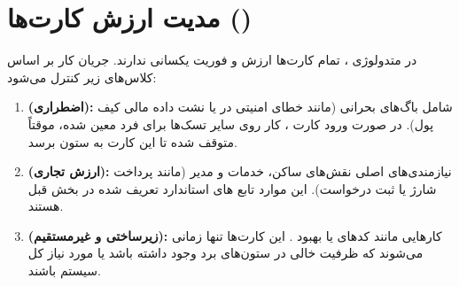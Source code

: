 \section{مدیت ارزش کارت‌ها ()}
در متدولوژی ، تمام کارت‌ها ارزش و فوریت یکسانی ندارند. جریان کار بر اساس کلاس‌های زیر کنترل می‌شود:
\begin{enumerate}
\item \textbf{ (اضطراری):} شامل باگ‌های بحرانی (مانند خطای امنیتی در  یا نشت داده مالی کیف پول). در صورت ورود کارت ، کار روی سایر تسک‌ها برای فرد معین شده، موقتاً متوقف شده تا این کارت به ستون  برسد.
\item \textbf{ (ارزش تجاری):} نیازمندی‌های اصلی نقش‌های ساکن، خدمات و مدیر (مانند پرداخت شارژ یا ثبت درخواست). این موارد تابع های استاندارد تعریف شده در بخش قبل هستند.
\item \textbf{ (زیرساختی و غیرمستقیم):} کارهایی مانند  کدهای  یا بهبود . این کارت‌ها تنها زمانی  می‌شوند که ظرفیت خالی در ستون‌های برد وجود داشته باشد یا مورد نیاز کل سیستم باشند.\end{enumerate}